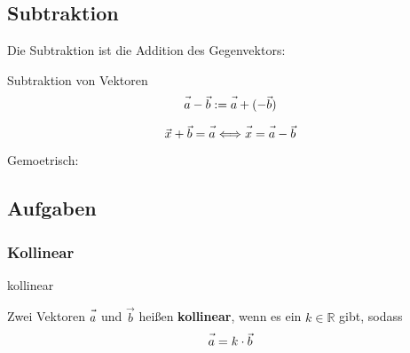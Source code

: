 \newpage

\subsection{Subtraktion}

Die Subtraktion ist die Addition des Gegenvektors:

\begin{definition}{Subtraktion von Vektoren}{}
  $$\vec{a\vphantom{b}} - \vec{b} := \vec{a\vphantom{b}} + (-\vec{b})$$
\end{definition}

\begin{bemerkung}{}{}
  $$\vec{x\vphantom{x}} + \vec{b} = \vec{a\vphantom{b}} \Longleftrightarrow \vec{x\vphantom{b}} = \vec{a\vphantom{b}} - \vec{b}$$
\end{bemerkung}

Gemoetrisch:


\subsection*{Aufgaben}
\newpage


\subsubsection{Kollinear}

\begin{definition}{kollinear}{}\label{linearkombination}

  Zwei Vektoren $\vec{a\vphantom{b}}$ und $\vec{b}$ heißen \textbf{kollinear}, wenn es ein
  $k\in\mathbb{R}$ gibt, sodass
  $$\vec{a\vphantom{b}} = k\cdot{}\vec{b}$$
  \end{definition}
\newpage



